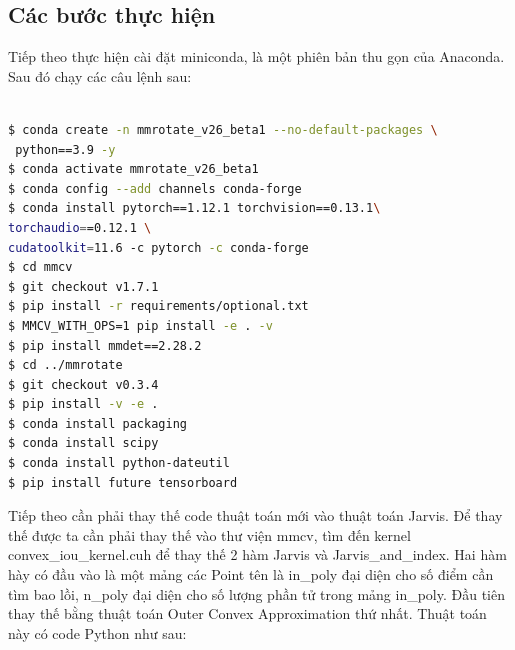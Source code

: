 \documentclass[12pt,a4paper,openany,oneside]{report}
\begin{document}
\subsection{Các bước thực hiện}
Tiếp theo thực hiện cài đặt miniconda, là một phiên bản thu gọn của Anaconda. Sau đó chạy các câu lệnh sau:


\begin{lstlisting}[language=bash, caption={Mô tả lệnh command line để tạo môi trường ảo}, label={lst:command-line}]

$ conda create -n mmrotate_v26_beta1 --no-default-packages \
 python==3.9 -y 
$ conda activate mmrotate_v26_beta1 
$ conda config --add channels conda-forge 
$ conda install pytorch==1.12.1 torchvision==0.13.1\ 
torchaudio==0.12.1 \
cudatoolkit=11.6 -c pytorch -c conda-forge 
$ cd mmcv
$ git checkout v1.7.1
$ pip install -r requirements/optional.txt 
$ MMCV_WITH_OPS=1 pip install -e . -v 
$ pip install mmdet==2.28.2 
$ cd ../mmrotate 
$ git checkout v0.3.4
$ pip install -v -e . 
$ conda install packaging 
$ conda install scipy 
$ conda install python-dateutil
$ pip install future tensorboard

\end{lstlisting}

Tiếp theo cần phải thay thế code thuật toán mới vào thuật toán Jarvis. Để thay thế được ta cần phải thay thế vào thư viện mmcv, tìm đến kernel convex\_iou\_kernel.cuh để thay thế 2 hàm Jarvis và Jarvis\_and\_index. Hai hàm hày có đầu vào là một mảng các Point tên là in\_poly đại diện cho số điểm cần tìm bao lồi, n\_poly đại diện cho số lượng phần tử trong mảng in\_poly. Đầu tiên thay thế bằng thuật toán Outer Convex Approximation thứ nhất. Thuật toán này có code Python như sau:
\end{document}
